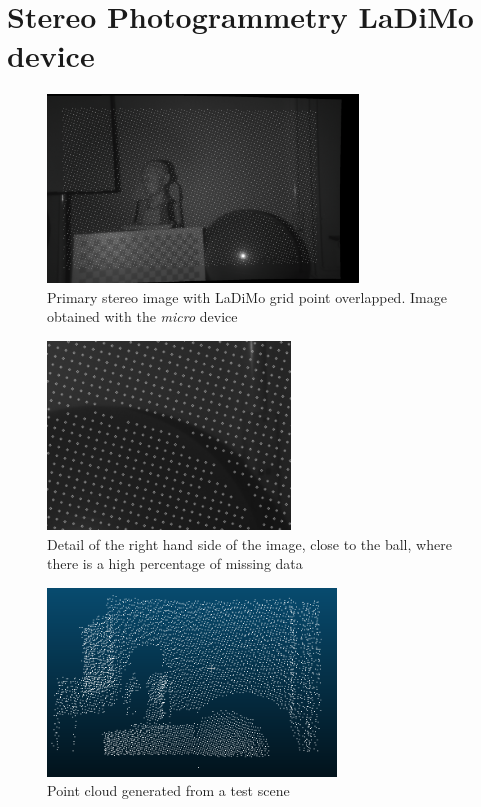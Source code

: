 \section{Stereo Photogrammetry LaDiMo device}
\label{section:stereo-device}

\begin{figure}[t]
	\begin{center}
		\includegraphics[width=.8\textwidth, height=5cm, keepaspectratio]{images/stereo-rectified-rgb.png}
		\caption{Primary stereo image with LaDiMo grid point overlapped. Image obtained with the \textit{micro} device}
		\label{fig:primary-stereo-input}
	\end{center}
\end{figure}

\begin{figure}[t]
	\begin{center}
		\includegraphics[width=.8\textwidth, height=5cm, keepaspectratio]{images/detail-missing-data.png}
		\caption{Detail of the right hand side of the image, close to the ball, where there is a high percentage of missing data}
		\label{fig:detail-missing-data}
	\end{center}
\end{figure}

\begin{figure}[t]
	\begin{center}
		\includegraphics[width=.8\textwidth, height=5cm, keepaspectratio]{images/point-cloud-example.png}
		\caption{Point cloud generated from a test scene}
		\label{fig:point-cloud-input}
	\end{center}
\end{figure}

